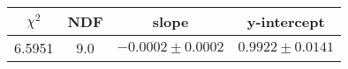 \begin{tabular}{|c|c|c|c|}

\hline
$\chi^{2}$ & NDF & slope & y-intercept  \\
\hline
6.5951 & 9.0 & $-0.0002\pm0.0002$ & $0.9922\pm0.0141$ \\
\hline

\end{tabular}
